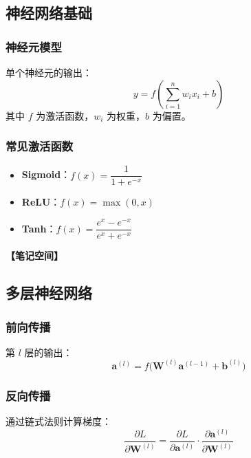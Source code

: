 \documentclass[12pt,a4paper]{article}
\newcommand{\notespace}[1][3cm]{%
  \vspace{#1}%
  \noindent\textbf{【笔记空间】}%
  \vspace{#1}%
}
\newcommand{\1}{\mathbf{1}}
\begin{document}
\subsection{神经网络基础}

\subsubsection*{神经元模型}

单个神经元的输出：
\begin{equation}
y=f\left(\sum_{i=1}^{n}w_i x_i+b\right)
\end{equation}
其中 $f$ 为激活函数，$w_i$ 为权重，$b$ 为偏置。

\subsubsection*{常见激活函数}

\begin{itemize}[leftmargin=2em]
  \item \textbf{Sigmoid}：$f(x)=\dfrac{1}{1+e^{-x}}$
  \item \textbf{ReLU}：$f(x)=\max(0,x)$
  \item \textbf{Tanh}：$f(x)=\dfrac{e^x-e^{-x}}{e^x+e^{-x}}$
\end{itemize}

\notespace[2cm]

\subsection{多层神经网络}

\subsubsection*{前向传播}

第 $l$ 层的输出：
\begin{equation}
\mathbf{a}^{(l)}=f\bigl(\mathbf{W}^{(l)}\mathbf{a}^{(l-1)}+\mathbf{b}^{(l)}\bigr)
\end{equation}

\subsubsection*{反向传播}

通过链式法则计算梯度：
\begin{equation}
\frac{\partial L}{\partial \mathbf{W}^{(l)}}=\frac{\partial L}{\partial \mathbf{a}^{(l)}}\cdot\frac{\partial \mathbf{a}^{(l)}}{\partial \mathbf{W}^{(l)}}
\end{equation}
\end{document}
